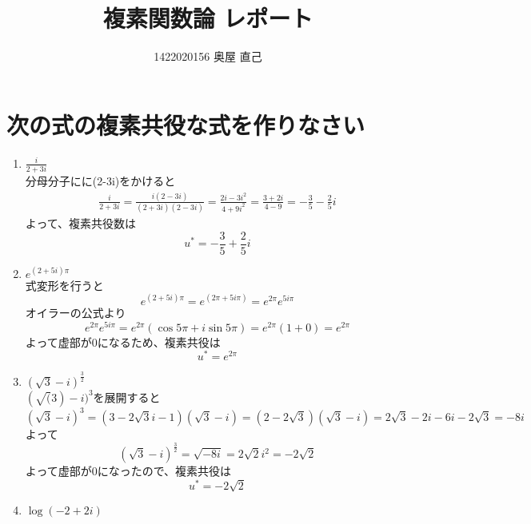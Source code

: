 \documentclass{jsarticle}
\title{複素関数論 レポート}
\author{ 1422020156 奥屋 直己}
\begin{document}
\maketitle

\section{次の式の複素共役な式を作りなさい}
	\begin{enumerate}[(1)]
		\item $\frac{i}{2+3i}$\\
			分母分子にに(2-3i)をかけると\\
			\begin{eqnarray*}
				\frac{i}{2+3i}=\frac{i(2-3i)}{(2+3i)(2-3i)}=\frac{2i-3i^2}{4+9i^2}=\frac{3+2i}{4-9}=-\frac{3}{5}-\frac{2}{5}i
			\end{eqnarray*}
			よって、複素共役数は
			\[
				u^*=-\frac{3}{5}+\frac{2}{5}i
			\]
		\item $e^{(2+5i)π}$ \\
			式変形を行うと
			\[
				e^{(2+5i)\pi}=e^{(2\pi+5i\pi)}=e^{2\pi}e^{5i\pi}
			\]
			オイラーの公式より
			\[
				e^{2\pi}e^{5i\pi}=e^{2\pi}(\cos5\pi+i\sin5\pi)=e^{2\pi}(1+0)=e^{2\pi}
			\]
			よって虚部が0になるため、複素共役は
			\[
				u^*=e^{2\pi}
			\]
		\item $(\sqrt{3}-i)^\frac{3}{2}$\\
			$(\sqrt(3)-i)^3$を展開すると
			\[
				(\sqrt{3}-i)^3=(3-2\sqrt{3}i-1)(\sqrt{3}-i)=(2-2\sqrt{3})(\sqrt{3}-i)=2\sqrt{3}-2i-6i-2\sqrt{3}=-8i
			\]
			よって
			\[
				(\sqrt{3}-i)^\frac{3}{2}=\sqrt{-8i}=2\sqrt{2}i^2=-2\sqrt{2}
			\]
			よって虚部が0になったので、複素共役は
			\[
				u^*=-2\sqrt{2}
			\]
			
		\item $\log{(-2+2i)}$ \\
			
	\end{enumerate}
\end{document}
